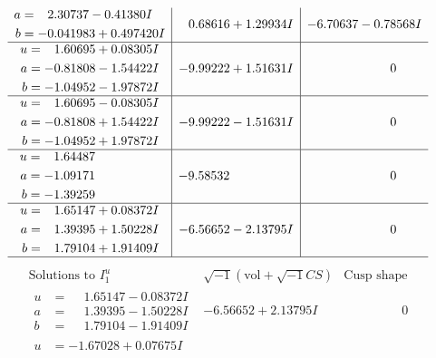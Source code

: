 \documentclass[1p]{elsarticle_modified}
\theoremstyle{definition}
\newcommand{\I}{\sqrt{-1}}
\begin{document}
$$\begin{array}{c|c|c}
\begin{aligned}
a &= \phantom{-}2.30737 - 0.41380 I \\
b &= -0.041983 + 0.497420 I\end{aligned}
 & \phantom{-}0.68616 + 1.29934 I & -6.70637 - 0.78568 I \\ \hline\begin{aligned}
u &= \phantom{-}1.60695 + 0.08305 I \\
a &= -0.81808 - 1.54422 I \\
b &= -1.04952 - 1.97872 I\end{aligned}
 & -9.99222 + 1.51631 I & \phantom{-0.000000 } 0 \\ \hline\begin{aligned}
u &= \phantom{-}1.60695 - 0.08305 I \\
a &= -0.81808 + 1.54422 I \\
b &= -1.04952 + 1.97872 I\end{aligned}
 & -9.99222 - 1.51631 I & \phantom{-0.000000 } 0 \\ \hline\begin{aligned}
u &= \phantom{-}1.64487\phantom{ +0.000000I} \\
a &= -1.09171\phantom{ +0.000000I} \\
b &= -1.39259\phantom{ +0.000000I}\end{aligned}
 & -9.58532\phantom{ +0.000000I} & \phantom{-0.000000 } 0 \\ \hline\begin{aligned}
u &= \phantom{-}1.65147 + 0.08372 I \\
a &= \phantom{-}1.39395 + 1.50228 I \\
b &= \phantom{-}1.79104 + 1.91409 I\end{aligned}
 & -6.56652 - 2.13795 I & \phantom{-0.000000 } 0\\
 \hline 
 \end{array}$$\newpage$$\begin{array}{c|c|c}  
\text{Solutions to }I^u_{1}& \I (\text{vol} + \sqrt{-1}CS) & \text{Cusp shape}\\
 \hline 
\begin{aligned}
u &= \phantom{-}1.65147 - 0.08372 I \\
a &= \phantom{-}1.39395 - 1.50228 I \\
b &= \phantom{-}1.79104 - 1.91409 I\end{aligned}
 & -6.56652 + 2.13795 I & \phantom{-0.000000 } 0 \\ \hline\begin{aligned}
u &= -1.67028 + 0.07675 I \\

\end{aligned}
\end{array}$$
\end{document}
